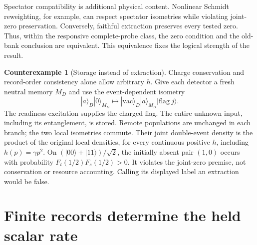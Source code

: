 \documentclass[11pt,oneside,openany]{book}
\theoremstyle{definition}
\newtheorem{counterexample}[theorem]{Counterexample}
\theoremstyle{remark}\newtheorem{remark}[theorem]{Remark}
\begin{document}
Spectator compatibility is additional physical content. Nonlinear
Schmidt reweighting, for example, can respect spectator isometries while
violating joint-zero preservation. Conversely, faithful extraction
preserves every tested zero. Thus, within the responsive complete-probe
class, the zero condition and the old-bank conclusion are equivalent.
This equivalence fixes the logical strength of the result.

\begin{counterexample}[Storage instead of extraction]\label{det:store-rival}
Charge conservation and record-order consistency alone allow arbitrary
$h$. Give each detector a fresh neutral memory $M_D$ and use the
event-dependent isometry
\[
 |a\rangle_D|0\rangle_{M_D}
 \longmapsto |\mathrm{vac}\rangle_D|a\rangle_{M_D}
                  |\mathrm{flag}\ j\rangle.
\]
The readiness excitation supplies the charged flag. The entire unknown
input, including its entanglement, is stored. Remote populations are
unchanged in each branch; the two local isometries commute. Their joint
double-event density is the product of the original local densities,
for every continuous positive $h$, including $h(p)=\gamma p^2$.
On $(|00\rangle+|11\rangle)/\sqrt2$, the initially absent pair
$(1,0)$ occurs with probability $F_t(1/2)F_s(1/2)>0$.
It violates the joint-zero premise, not conservation or resource
accounting. Calling its displayed label an extraction would be false.
\end{counterexample}

\section{Finite records determine the held scalar rate}
\end{document}
